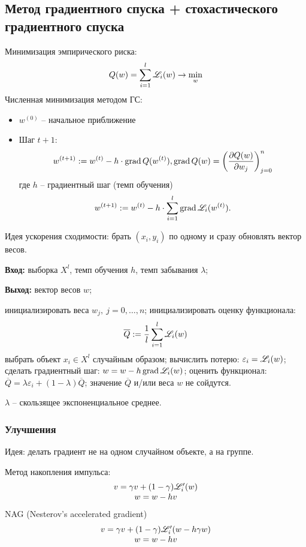 \begin{multicols}{2}
     \subsection*{Метод градиентного спуска + стохастического градиентного спуска}
     Минимизация эмпирического риска:
     \[
        Q(w) = \sum\limits_{i=1}^l \mathscr{L}_i(w) \to \min\limits_w
     \] 
     Численная минимизация методом ГС:
     \begin{itemize}
      \item[] $w^{(0)}$ -- начальное приближение
      \item[] Шаг $t+1$:
      \[
          w^{(t+1)} := w^{(t)} - h\cdot \grad Q(w^{(t)}), \hfill \grad{Q(w)} = \left(\dfrac{\partial Q(w)}{\partial w_j}\right)_{j=0}^n
      \]
      где $h$ -- градиентный шаг (темп обучения)
      \[
        w^{(t+1)} := w^{(t)} - h\cdot\sum\limits_{i=1}^l \operatorname{grad} \mathscr{L}_i(w^{(t)}).
        \]
     \end{itemize}
     Идея ускорения сходимости: брать $(x_i, y_i)$ по одному и сразу обновлять вектор весов.
     \par
     \textbf{Вход: } выборка $X^l$, темп обучения $h$, темп забывания $\lambda$;
     \par
     \textbf{Выход: } вектор весов $w$;
      \begin{algorithmic}[1]
        \State инициализировать веса $w_j, \ j=0,\ldots, n$;
        \State инициализировать оценку функционала:
        \[
            \overline{Q} := \dfrac{1}{l}\sum\limits_{i=1}^l \mathscr{L}_i(w)
        \]
        \Repeat
        \State выбрать объект $x_i \in X^l$ случайным образом;
        \State вычислить потерю: $\varepsilon_i = \mathscr{L}_i(w)$;
        \State сделать градиентный шаг: \mbox{$w = w - h\operatorname{grad}{\mathscr{L}}_i(w)$};
        \State оценить функционал: $\overline{Q} = \lambda \varepsilon_i + (1-\lambda)\overline{Q}$;
        \Until значение $\overline{Q}$ и/или веса $w$ не сойдутся.
      \end{algorithmic}
    $\lambda$ -- скользящее экспоненциальное среднее.
    \subsubsection*{Улучшения}
    Идея: делать градиент не на одном случайном объекте, а на группе.
    \par 
    Метод накопления импульса:
    \[
        \begin{array}{c}
          v = \gamma v + (1-\gamma)\mathscr{L}'_i(w)\\
          w = w - hv
        \end{array}
    \]
    NAG (Nesterov's accelerated gradient)
    \[
        \begin{array}{c}
          v = \gamma v+(1-\gamma)\mathscr{L}_i' (w-h\gamma w)\\
          w = w-hv
        \end{array}
    \]

\end{multicols}
